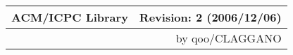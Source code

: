 \documentclass{jsarticle}
\newcommand{\mymaketitle}[3]%
 {\begin{center}\begin{tabular}{lr}\textsf{\huge #1}\hspace{3.5cm}\mbox{}&#3\\\hline&#2\end{tabular}\end{center}}
\begin{document}
\mymaketitle{ACM/ICPC Library}{by qoo/CLAGGANO}{Revision: 2 (2006/12/06)}
\tableofcontents
\newpage









\end{document}
